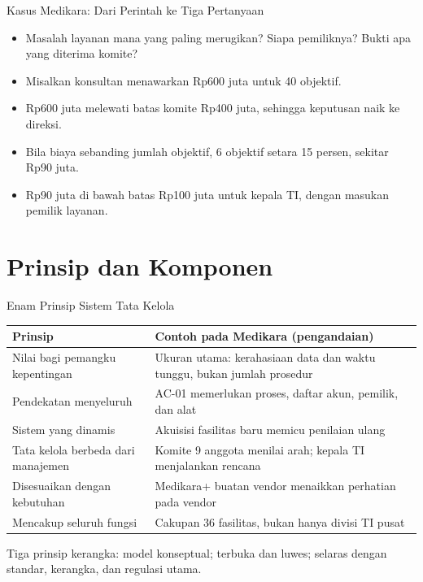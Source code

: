 \documentclass[aspectratio=169, table, 12pt]{beamer}
\begin{document}
\begin{frame}{{\Large Kasus Medikara: Dari Perintah ke Tiga Pertanyaan}}
  \vspace{4pt}
  \small
  \begin{itemize}
    \item Masalah layanan mana yang paling merugikan? Siapa pemiliknya? Bukti apa yang diterima komite?
    \item Misalkan konsultan menawarkan Rp600 juta untuk 40 objektif.
    \item Rp600 juta melewati batas komite Rp400 juta, sehingga keputusan naik ke direksi.
    \item Bila biaya sebanding jumlah objektif, 6 objektif setara 15 persen, sekitar Rp90 juta.
    \item Rp90 juta di bawah batas Rp100 juta untuk kepala TI, dengan masukan pemilik layanan.
  \end{itemize}
\end{frame}

\section{Prinsip dan Komponen}

\begin{frame}{{\Large Enam Prinsip Sistem Tata Kelola}}
  \vspace{2pt}
  \scriptsize
  \begin{tabularx}{\textwidth}{|>{\raggedright\arraybackslash}p{}|>{\raggedright\arraybackslash}X|}
    \hline
    \textbf{Prinsip} & \textbf{Contoh pada Medikara (pengandaian)} \\ \hline
    Nilai bagi pemangku kepentingan & Ukuran utama: kerahasiaan data dan waktu tunggu, bukan jumlah prosedur \\ \hline
    Pendekatan menyeluruh & AC-01 memerlukan proses, daftar akun, pemilik, dan alat \\ \hline
    Sistem yang dinamis & Akuisisi fasilitas baru memicu penilaian ulang \\ \hline
    Tata kelola berbeda dari manajemen & Komite 9 anggota menilai arah; kepala TI menjalankan rencana \\ \hline
    Disesuaikan dengan kebutuhan & Medikara+ buatan vendor menaikkan perhatian pada vendor \\ \hline
    Mencakup seluruh fungsi & Cakupan 36 fasilitas, bukan hanya divisi TI pusat \\ \hline
  \end{tabularx}

  \vspace{6pt}
  \small Tiga prinsip kerangka: model konseptual; terbuka dan luwes; selaras dengan standar, kerangka, dan regulasi utama.
\end{frame}
\end{document}
